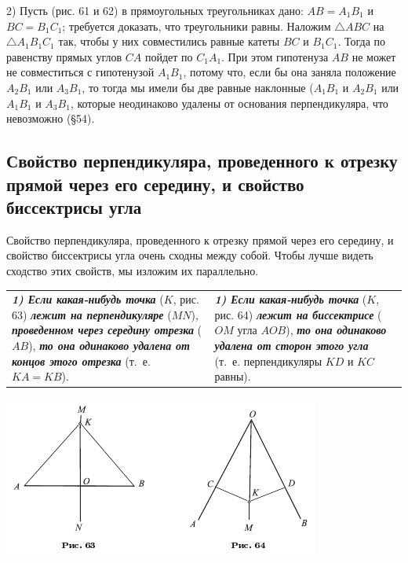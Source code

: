 \documentclass[oneside]{book}
\begin{document}
2) Пусть (рис. 61 и 62) в прямоугольных треугольниках дано:
$AB=A_1B_1$ и $BC=B_1C_1$;
требуется доказать, что треугольники равны.
Наложим $\triangle ABC$ на $\triangle A_1B_1C_1$ так, чтобы у них совместились равные катеты $BC$ и $B_1C_1$.
Тогда по равенству прямых углов $CA$ пойдет по $C_1A_1$.
При этом гипотенуза $AB$ не может не совместиться с гипотенузой $A_1B_1$, потому что, если бы она заняла положение $A_2B_1$ или $A_3B_1$, то тогда мы имели бы две равные наклонные ($A_1B_1$ и $A_2B_1$ или $A_1B_1$ и $A_3B_1$, которые неодинаково удалены от основания перпендикуляра, что невозможно (§54).

\subsection*{Свойство перпендикуляра, проведенного к отрезку прямой через его середину, и свойство биссектрисы угла}

Свойство перпендикуляра, проведенного к отрезку прямой через его середину, и свойство биссектрисы угла очень сходны между собой.
Чтобы лучше видеть сходство этих свойств, мы изложим их параллельно.

\medskip

\noindent
\begin{tabular}{ p{}| p{} }
\textbf{\emph{1) Если какая-нибудь точка}} ($K$, рис. 63) \textbf{\emph{лежит на перпендикуляре}} ($MN$), \textbf{\emph{проведенном через середину отрезка}} ($AB$), \textbf{\emph{то она одинаково удалена от концов этого отрезка}} (т.~е. $KA=KB$).
&
\textbf{\emph{1) Если какая-нибудь точка}} ($K$, рис. 64) \textbf{\emph{лежит на биссектрисе}} ($OM$ угла $AOB$), \textbf{\emph{то она одинаково удалена от сторон этого угла}} (т.~е. перпендикуляры $KD$ и $KC$ равны).
\end{tabular}

\medskip

\includegraphics{pics/ris-63-64}

\medskip
\end{document}
